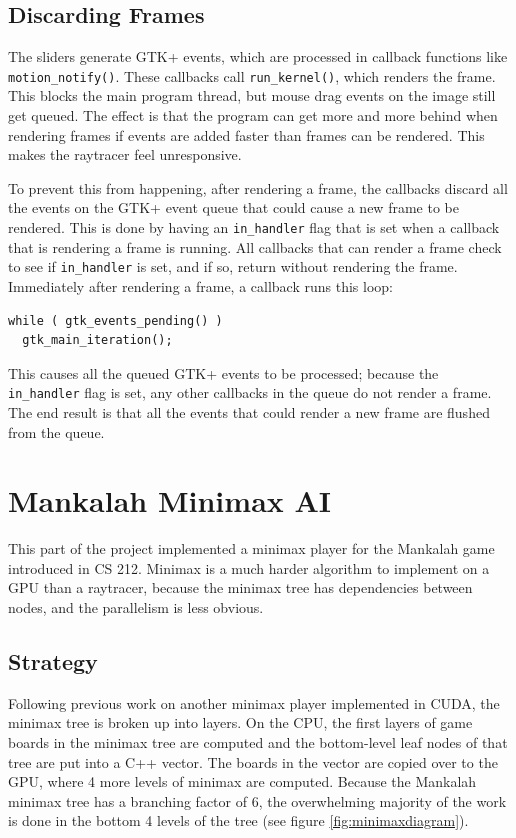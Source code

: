 \documentclass{article}
\begin{document}
\subsection{Discarding Frames}
The sliders generate GTK+ events, which are processed in callback functions like \texttt{motion\_notify()}. These callbacks call \texttt{run\_kernel()}, which renders the frame. This blocks the main program thread, but mouse drag events on the image still get queued. The effect is that the program can get more and more behind when rendering frames if events are added faster than frames can be rendered. This makes the raytracer feel unresponsive.

To prevent this from happening, after rendering a frame, the callbacks discard all the events on the GTK+ event queue that could cause a new frame to be rendered. This is done by having an \texttt{in\_handler} flag that is set when a callback that is rendering a frame is running. All callbacks that can render a frame check to see if \texttt{in\_handler} is set, and if so, return without rendering the frame. Immediately after rendering a frame, a callback runs this loop:

\begin{lstlisting}
while ( gtk_events_pending() )
  gtk_main_iteration();
\end{lstlisting}

This causes all the queued GTK+ events to be processed; because the \texttt{in\_handler} flag is set, any other callbacks in the queue do not render a frame. The end result is that all the events that could render a new frame are flushed from the queue.

\section{Mankalah Minimax AI}
This part of the project implemented a minimax player for the Mankalah game introduced in CS 212. Minimax is a much harder algorithm to implement on a GPU than a raytracer, because the minimax tree has dependencies between nodes, and the parallelism is less obvious.

\subsection{Strategy}
Following previous work on another minimax player implemented in CUDA\cite{rockisuda10}, the minimax tree is broken up into layers. On the CPU, the first layers of game boards in the minimax tree are computed and the bottom-level leaf nodes of that tree are put into a C++ vector. The boards in the vector are copied over to the GPU, where 4 more levels of minimax are computed. Because the Mankalah minimax tree has a branching factor of 6, the overwhelming majority of the work is done in the bottom 4 levels of the tree (see figure \ref{fig:minimaxdiagram}).
\end{document}
